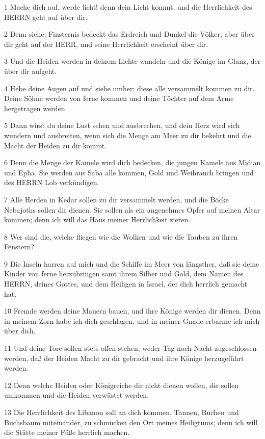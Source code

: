 \par 1 Mache dich auf, werde licht! denn dein Licht kommt, und die Herrlichkeit des HERRN geht auf über dir.
\par 2 Denn siehe, Finsternis bedeckt das Erdreich und Dunkel die Völker; aber über dir geht auf der HERR, und seine Herrlichkeit erscheint über dir.
\par 3 Und die Heiden werden in deinem Lichte wandeln und die Könige im Glanz, der über dir aufgeht.
\par 4 Hebe deine Augen auf und siehe umher: diese alle versammelt kommen zu dir. Deine Söhne werden von ferne kommen und deine Töchter auf dem Arme hergetragen werden.
\par 5 Dann wirst du deine Lust sehen und ausbrechen, und dein Herz wird sich wundern und ausbreiten, wenn sich die Menge am Meer zu dir bekehrt und die Macht der Heiden zu dir kommt.
\par 6 Denn die Menge der Kamele wird dich bedecken, die jungen Kamele aus Midian und Epha. Sie werden aus Saba alle kommen, Gold und Weihrauch bringen und des HERRN Lob verkündigen.
\par 7 Alle Herden in Kedar sollen zu dir versammelt werden, und die Böcke Nebajoths sollen dir dienen. Sie sollen als ein angenehmes Opfer auf meinen Altar kommen; denn ich will das Haus meiner Herrlichkeit zieren.
\par 8 Wer sind die, welche fliegen wie die Wolken und wie die Tauben zu ihren Fenstern?
\par 9 Die Inseln harren auf mich und die Schiffe im Meer von längsther, daß sie deine Kinder von ferne herzubringen samt ihrem Silber und Gold, dem Namen des HERRN, deines Gottes, und dem Heiligen in Israel, der dich herrlich gemacht hat.
\par 10 Fremde werden deine Mauern bauen, und ihre Könige werden dir dienen. Denn in meinem Zorn habe ich dich geschlagen, und in meiner Gnade erbarme ich mich über dich.
\par 11 Und deine Tore sollen stets offen stehen, weder Tag noch Nacht zugeschlossen werden, daß der Heiden Macht zu dir gebracht und ihre Könige herzugeführt werden.
\par 12 Denn welche Heiden oder Königreiche dir nicht dienen wollen, die sollen umkommen und die Heiden verwüstet werden.
\par 13 Die Herrlichkeit des Libanon soll an dich kommen, Tannen, Buchen und Buchsbaum miteinander, zu schmücken den Ort meines Heiligtums; denn ich will die Stätte meiner Füße herrlich machen.
